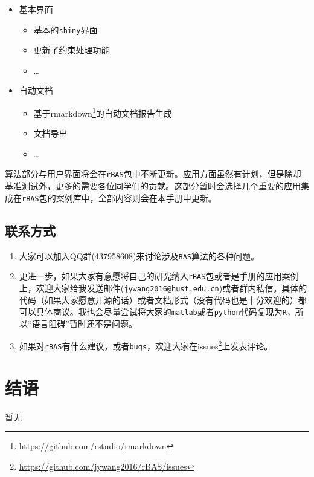 \documentclass[]{ctexbook}
\providecommand{\tightlist}{%
  \setlength{\itemsep}{0pt}\setlength{\parskip}{0pt}}
\renewcommand{\href}[2]{#2\footnote{\url{#1}}}
\theoremstyle{definition}
\theoremstyle{definition}
\theoremstyle{definition}
\theoremstyle{remark}
\begin{document}
\begin{itemize}
\tightlist
\item
  基本界面

  \begin{itemize}
  \tightlist
  \item
    \sout{基本的\texttt{shiny}界面}
  \item
    \sout{更新了约束处理功能}
  \item
    \ldots{}
  \end{itemize}
\item
  自动文档

  \begin{itemize}
  \tightlist
  \item
    基于\href{https://github.com/rstudio/rmarkdown}{rmarkdown}的自动文档报告生成
  \item
    文档导出
  \item
    \ldots{}
  \end{itemize}
\end{itemize}

算法部分与用户界面将会在\texttt{rBAS}包中不断更新。应用方面虽然有计划，但是除却基准测试外，更多的需要各位同学们的贡献。这部分暂时会选择几个重要的应用集成在\texttt{rBAS}包的案例库中，全部内容则会在本手册中更新。

\section{联系方式}

\begin{enumerate}
\def\labelenumi{\arabic{enumi}.}
\item
  大家可以加入QQ群(437958608)来讨论涉及\texttt{BAS}算法的各种问题。
\item
  更进一步，如果大家有意愿将自己的研究纳入\texttt{rBAS}包或者是手册的应用案例上，欢迎大家给我发送邮件(\texttt{jywang2016@hust.edu.cn})或者群内私信。具体的代码（如果大家愿意开源的话）或者文档形式（没有代码也是十分欢迎的）都可以具体商议。我也会尽量尝试将大家的\texttt{matlab}或者\texttt{python}代码复现为\texttt{R}，所以``语言阻碍''暂时还不是问题。
\item
  如果对\texttt{rBAS}有什么建议，或者\texttt{bugs}，欢迎大家在\href{https://github.com/jywang2016/rBAS/issues}{issues}上发表评论。
\end{enumerate}

\cleardoublepage 

\appendix {}


\chapter*{结语}


暂无



\backmatter
\printindex
\end{document}
